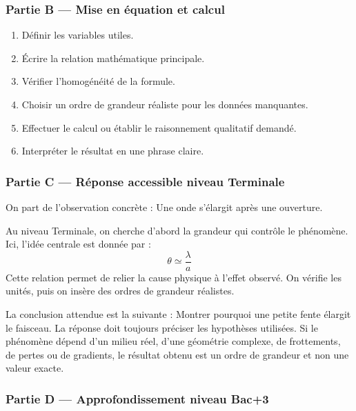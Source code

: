 \documentclass[11pt,a4paper]{article}
\begin{document}
\subsubsection*{Partie B — Mise en équation et calcul}

\begin{enumerate}
  \item Définir les variables utiles.
  \item Écrire la relation mathématique principale.
  \item Vérifier l'homogénéité de la formule.
  \item Choisir un ordre de grandeur réaliste pour les données manquantes.
  \item Effectuer le calcul ou établir le raisonnement qualitatif demandé.
  \item Interpréter le résultat en une phrase claire.
\end{enumerate}

\subsubsection*{Partie C — Réponse accessible niveau Terminale}

\begin{corrigebox}
On part de l'observation concrète : Une onde s'élargit après une ouverture.

Au niveau Terminale, on cherche d'abord la grandeur qui contrôle le phénomène. Ici, l'idée centrale est donnée par :
\[
\theta\simeq\frac{\lambda}{a}
\]
Cette relation permet de relier la cause physique à l'effet observé. On vérifie les unités, puis on insère des ordres de grandeur réalistes.

La conclusion attendue est la suivante : Montrer pourquoi une petite fente élargit le faisceau. La réponse doit toujours préciser les hypothèses utilisées. Si le phénomène dépend d'un milieu réel, d'une géométrie complexe, de frottements, de pertes ou de gradients, le résultat obtenu est un ordre de grandeur et non une valeur exacte.
\end{corrigebox}

\subsubsection*{Partie D — Approfondissement niveau Bac+3}
\end{document}
